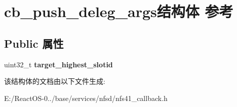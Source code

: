 \hypertarget{structcb__push__deleg__args}{}\section{cb\+\_\+push\+\_\+deleg\+\_\+args结构体 参考}
\label{structcb__push__deleg__args}
\subsection*{Public 属性}
\begin{DoxyCompactItemize}
\item 
\mbox{\label{structcb__push__deleg__args_a4e68ca579fe7b9dac4267ee54cd35b29}} 
uint32\+\_\+t {\bfseries target\+\_\+highest\+\_\+slotid}
\end{DoxyCompactItemize}


该结构体的文档由以下文件生成\+:\begin{DoxyCompactItemize}
\item 
E\+:/\+React\+O\+S-\/0../base/services/nfsd/nfs41\+\_\+callback.\+h\end{DoxyCompactItemize}

